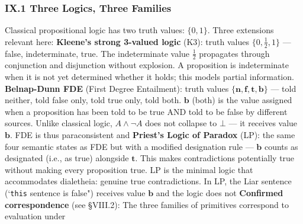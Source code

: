 \documentclass[12pt,a4paper]{article}
\makeatletter
\renewcommand{\_}{\ig@origunderscore\discretionary{}{}{}}
\makeatother
\begin{document}
\subsubsection{IX.1 Three Logics, Three Families}
Classical propositional logic has two truth values: $\{0, 1\}$. Three extensions relevant here:
\textbf{Kleene's strong 3-valued logic} (K3): truth values $\{0, \frac{1}{2}, 1\}$ --- false, indeterminate, true. The
indeterminate value $\frac{1}{2}$ propagates through conjunction and disjunction without explosion. A proposition is
indeterminate when it is not yet determined whether it holds; this models partial information.
\textbf{Belnap-Dunn FDE} (First Degree Entailment): truth values $\{\mathbf{n}, \mathbf{f},\mathbf{t}, \mathbf{b}\}$
--- told neither, told false only, told true only, told both. $\mathbf{b}$ (both) is the value assigned when a
proposition has been told to be true AND told to be false by different sources. Unlike classical
logic, $A \wedge \neg A$ does not collapse to $\bot$ --- it receives value $\mathbf{b}$. FDE is thus paraconsistent and
\textbf{Priest's Logic of Paradox} (LP): the same four semantic states as FDE but with a modified designation rule ---
$\mathbf{b}$ counts as designated (i.e., as true) alongside $\mathbf{t}$. This makes contradictions potentially true
without making every proposition true. LP is the minimal logic that accommodates dialetheia: genuine true
contradictions. In LP, the Liar sentence (`\texttt{this} sentence is false") receives value $\mathbf{b}$ and the logic does not
\textbf{Confirmed correspondence} (see \S VIII.2): The three families of primitives correspond to evaluation under
\end{document}
